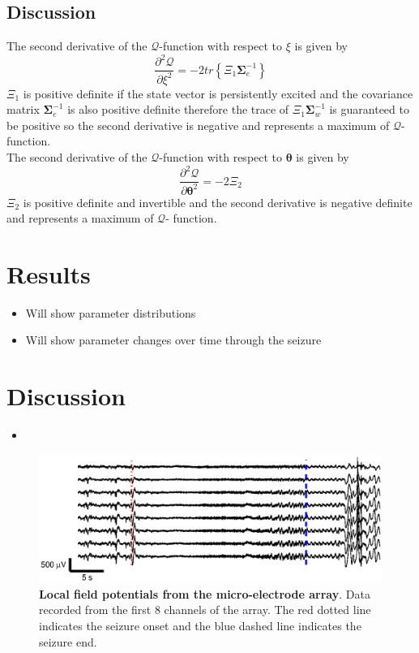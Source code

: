 \documentclass[]{article}
\begin{document}
\subsection{Discussion}
The second derivative of the $\mathcal Q$-function with respect to $\xi$ is given by
\begin{equation}
 \frac{\partial^2 \mathcal Q}{\partial \xi^2}=-2 tr \left\lbrace\Xi_1\boldsymbol\Sigma_e^{-1} \right\rbrace
\end{equation}
$\Xi_1 $ is positive definite if the state vector is persistently excited and the covariance matrix $\boldsymbol\Sigma_e^{-1}$ is also positive definite therefore the trace of $\Xi_1\boldsymbol\Sigma_w^{-1}$ is guaranteed to be positive so the second derivative is negative and represents a maximum of $\mathcal Q$-function.\\
The second derivative of the $\mathcal Q$-function with respect to $\boldsymbol \theta$ is given by
\begin{equation}
 \frac{\partial^2 \mathcal Q}{\partial \boldsymbol\theta^2}=-2 \Xi_2 
\end{equation}
$\Xi_2$ is positive definite and invertible and the second derivative is negative definite and represents a maximum of $\mathcal Q$- function.

\section{Results}
\begin{itemize}
	\item Will show parameter distributions
	\item Will show parameter changes over time through the seizure
\end{itemize}

\section{Discussion}

\begin{itemize}
	\item  
\end{itemize}

\begin{figure}[!ht]
\begin{center}
\includegraphics{./Figures/LFPs.eps}
\end{center}
\caption{{\bf Local field potentials from the micro-electrode array}. Data recorded from the first 8 channels of the array. The red dotted line indicates the seizure onset and the blue dashed line indicates the seizure end.}
\label{fig:TimeSeries}
\end{figure}
\end{document}
